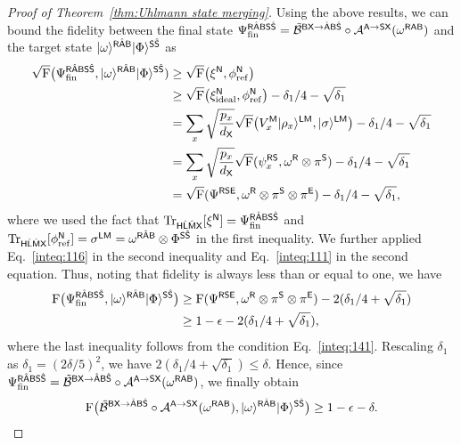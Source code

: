 \begin{proof}[Proof of Theorem~\ref{thm:Uhlmann state merging}]
Using the above results, we can bound the fidelity between the final state $\Psi_{\rm fin}^{\sR\hat{\sA}\sB\sS\hat{\sS}} = \til{\cB}^{\sB\sX\rarr\hat{\sA}\sB\hat{\sS}}\circ\cA^{\sA\rarr\sS\sX}(\omega^{\sR\sA\sB})$ and the target state $\ket{\omega}^{\sR\hat{\sA}\sB}\ket{\Phi}^{\sS\hat{\sS}}$ as
\begin{align}
    \sqrt{\rF}\big(\Psi_{\rm fin}^{\sR\hat{\sA}\sB\sS\hat{\sS}}, \ket{\omega}^{\sR\hat{\sA}\sB}\ket{\Phi}^{\sS\hat{\sS}}) 
    &\geq \sqrt{\rF}\big(\xi^\sN, \phi_{\rm ref}^{\sN}\big) \\
    &\geq \sqrt{\rF}\big(\xi_{\rm ideal}^\sN, \phi_{\rm ref}^\sN\big) - \delta_1/4 - \sqrt{\delta_1} \\
    &= \sum_x \sqrt{\f{p_x}{d_\sX}}\sqrt{\rF}\big(V_x^\sM\ket{\rho_x}^{\sL\sM}, \ket{\sigma}^{\sL\sM}\big) - \delta_1/4 - \sqrt{\delta_1} \\
    &= \sum_x \sqrt{\f{p_x}{d_\sX}}\sqrt{\rF}(\psi_x^{\sR\sS}, \omega^\sR \otimes \pi^\sS) - \delta_1/4 - \sqrt{\delta_1} \\
    &= \sqrt{\rF}(\Psi^{\sR\sS\sE}, \omega^\sR \otimes \pi^\sS \otimes \pi^\sE) - \delta_1/4 - \sqrt{\delta_1},
\end{align}
where we used the fact that $\tr_{\sH\hat{\sL}\hat{\sM}\sX}[\xi^\sN] = \Psi_{\rm fin}^{\sR\hat{\sA}\sB\sS\hat{\sS}}$ and $\tr_{\sH\hat{\sL}\hat{\sM}\sX}[\phi_{\rm ref}^\sN] = \sigma^{\sL\sM} = \omega^{\sR\hat{\sA}\sB}\otimes\Phi^{\sS\hat{\sS}}$ in the first inequality.
We further applied Eq.~\eqref{inteq:116} in the second inequality and Eq.~\eqref{inteq:111} in the second equation.
Thus, noting that fidelity is always less than or equal to one, we have
\begin{align}
    \rF\big(\Psi_{\rm fin}^{\sR\hat{\sA}\sB\sS\hat{\sS}}, \ket{\omega}^{\sR\hat{\sA}\sB} \ket{\Phi}^{\sS\hat{\sS}}\big)
    &\geq \rF(\Psi^{\sR\sS\sE}, \omega^\sR \otimes \pi^\sS \otimes \pi^\sE) - 2(\delta_1/4 + \sqrt{\delta_1}) \\
    \label{inteq:112}
    &\geq 1 - \epsilon - 2(\delta_1/4 + \sqrt{\delta_1}),
\end{align}
where the last inequality follows from the condition Eq.~\eqref{inteq:141}.
Rescaling $\delta_1$ as $\delta_1 = (2\delta/5)^2$, we have $2(\delta_1/4 + \sqrt{\delta_1}) \leq \delta$.
Hence, since $\Psi_{\rm fin}^{\sR\hat{\sA}\sB\sS\hat{\sS}} = \til{\cB}^{\sB\sX\rarr\hat{\sA}\sB\hat{\sS}}\circ\cA^{\sA\rarr\sS\sX}(\omega^{\sR\sA\sB})$, we finally obtain 
\begin{align}
    \rF\big(\til{\cB}^{\sB\sX\rarr\hat{\sA}\sB\hat{\sS}}\circ\cA^{\sA\rarr\sS\sX}(\omega^{\sR\sA\sB}), \ket{\omega}^{\sR\hat{\sA}\sB} \ket{\Phi}^{\sS\hat{\sS}}\big) \geq 1 - \epsilon - \delta.
\end{align}




\end{proof}
